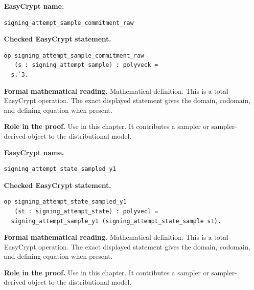 \begin{formaldefinition}
\noindent\textbf{EasyCrypt name.}
\begin{lstlisting}[language=EasyCrypt,basicstyle=\ttfamily\scriptsize]
signing_attempt_sample_commitment_raw
\end{lstlisting}
\noindent\textbf{Checked EasyCrypt statement.}
\begin{lstlisting}[language=EasyCrypt,basicstyle=\ttfamily\scriptsize]
op signing_attempt_sample_commitment_raw
   (s : signing_attempt_sample) : polyveck =
  s.`3.
\end{lstlisting}
\noindent\textbf{Formal mathematical reading.}
Mathematical definition. This is a total EasyCrypt operation.  The exact displayed statement gives the domain, codomain, and defining equation when present.

\noindent\textbf{Role in the proof.}
Use in this chapter. It contributes a sampler or sampler-derived object to the distributional model.

\end{formaldefinition}

\begin{formaldefinition}
\noindent\textbf{EasyCrypt name.}
\begin{lstlisting}[language=EasyCrypt,basicstyle=\ttfamily\scriptsize]
signing_attempt_state_sampled_y1
\end{lstlisting}
\noindent\textbf{Checked EasyCrypt statement.}
\begin{lstlisting}[language=EasyCrypt,basicstyle=\ttfamily\scriptsize]
op signing_attempt_state_sampled_y1
   (st : signing_attempt_state) : polyvecl =
  signing_attempt_sample_y1 (signing_attempt_state_sample st).
\end{lstlisting}
\noindent\textbf{Formal mathematical reading.}
Mathematical definition. This is a total EasyCrypt operation.  The exact displayed statement gives the domain, codomain, and defining equation when present.

\noindent\textbf{Role in the proof.}
Use in this chapter. It contributes a sampler or sampler-derived object to the distributional model.

\end{formaldefinition}

